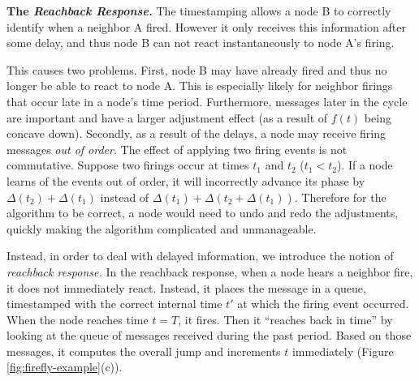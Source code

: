 {\bf The {\em Reachback Response.}} The timestamping allows a node B
to correctly identify when a neighbor A fired. However it only
receives this information after some delay, and thus node B can not
react instantaneously to node A's firing.

This causes two problems. First, node B may have already fired and
thus no longer be able to react to node A. This is especially likely
for neighbor firings that occur late in a node's time
period. Furthermore, messages later in the cycle are important and
have a larger adjustment effect (as a result of $f(t)$ being concave
down). Secondly, as a result of the delays, a node may receive firing
messages {\em out of order}. The effect of applying two firing events
is not commutative. Suppose two firings occur at times $t_1$ and $t_2$
($t_1<t_2$). If a node learns of the events out of order, it will
incorrectly advance its phase by $\Delta(t_2) + \Delta(t_1)$ instead
of $\Delta(t_1) + \Delta(t_2 + \Delta(t_1))$. Therefore for the
algorithm to be correct, a node would need to undo and redo the
adjustments, quickly making the algorithm complicated and
unmanageable.

Instead, in order to deal with delayed information, we introduce the
notion of {\em reachback response.} In the reachback response, when a
node hears a neighbor fire, it does not immediately react. Instead, it
places the message in a queue, timestamped with the correct internal
time $t'$ at which the firing event occurred. When the node reaches
time $t=T$, it fires. Then it ``reaches back in time'' by looking at
the queue of messages received during the past period. Based on those
messages, it computes the overall jump and increments $t$ immediately
(Figure \ref{fig:firefly-example}(c)).

